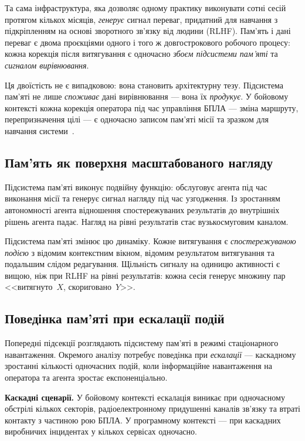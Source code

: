 \documentclass[11pt]{article}
\begin{document}
Та сама інфраструктура, яка дозволяє одному практику виконувати сотні сесій протягом кількох місяців, \emph{генерує} сигнал переваг, придатний для навчання з підкріпленням на основі зворотного зв'язку від людини (RLHF).
Пам'ять і дані переваг є двома проєкціями одного і того ж довгострокового робочого процесу: кожна корекція після витягування є одночасно \emph{збоєм підсистеми пам'яті} та \emph{сигналом вирівнювання}.

Ця двоїстість не є випадковою: вона становить архітектурну тезу.
Підсистема пам'яті не лише \emph{споживає} дані вирівнювання --- вона їх \emph{продукує}.
У бойовому контексті кожна корекція оператора під час управління БПЛА --- зміна маршруту, перепризначення цілі --- є одночасно записом пам'яті місії та зразком для навчання системи~\citep{ovcharov2026edittrace}.

\subsection{Пам'ять як поверхня масштабованого нагляду}
\label{sec:disc-oversight-surface}

Підсистема пам'яті виконує подвійну функцію: обслуговує агента під час виконання місії та генерує сигнал нагляду під час узгодження.
Із зростанням автономності агента відношення спостережуваних результатів до внутрішніх рішень агента падає.
Нагляд на рівні результатів стає вузькосмуговим каналом.

Підсистема пам'яті змінює цю динаміку.
Кожне витягування є \emph{спостережуваною подією} з відомим контекстним вікном, відомим результатом витягування та подальшим слідом редагування.
Щільність сигналу на одиницю активності є вищою, ніж при RLHF на рівні результатів: кожна сесія генерує множину пар <<витягнуто~$X$, скориговано~$Y$>>.

\subsection{Поведінка пам'яті при ескалації подій}
\label{sec:disc-escalation}

Попередні підсекції розглядають підсистему пам'яті в режимі стаціонарного навантаження.
Окремого аналізу потребує поведінка при \emph{ескалації} --- каскадному зростанні кількості одночасних подій, коли інформаційне навантаження на оператора та агента зростає експоненціально.

\textbf{Каскадні сценарії.}
У бойовому контексті ескалація виникає при одночасному обстрілі кількох секторів, радіоелектронному придушенні каналів зв'язку та втраті контакту з частиною рою БПЛА.
У програмному контексті --- при каскадних виробничих інцидентах у кількох сервісах одночасно.
\end{document}
